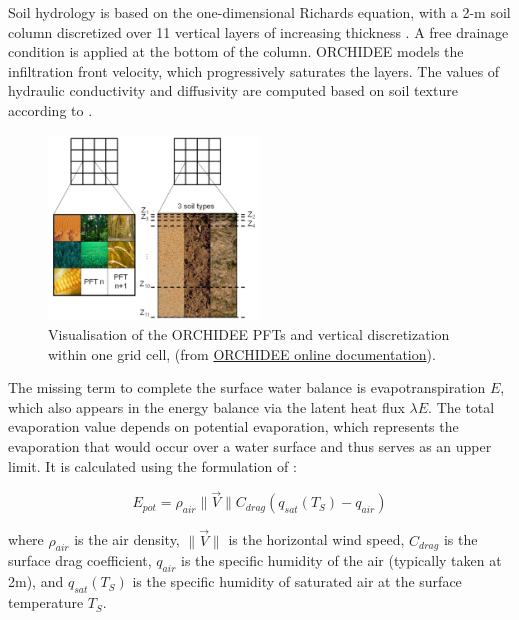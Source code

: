 Soil hydrology is based on the one-dimensional Richards equation, with a 2-m soil column discretized over 11 vertical layers of increasing thickness \citep{de_rosnay_impact_2002, dorgeval_sensitivity_2008}. A free drainage condition is applied at the bottom of the column. ORCHIDEE models the infiltration front velocity, which progressively saturates the layers. The values of hydraulic conductivity and diffusivity are computed based on soil texture according to \citet{mualem_new_1976, van_genuchten_closed-form_1980}.

\begin{figure}[hbtp]
    \centering
    \includegraphics[width=0.5\textwidth]{images/methods/ORC_discretization.png}
    \caption{Visualisation of the ORCHIDEE PFTs and vertical discretization within one grid cell, (from \href{https://orchidee.ipsl.fr/introduction/}{ORCHIDEE online documentation}).}
    \label{fig:ORC_discretization}
\end{figure}

The missing term to complete the surface water balance is evapotranspiration $E$, which also appears in the energy balance via the latent heat flux $\lambda E$. The total evaporation value depends on potential evaporation, which represents the evaporation that would occur over a water surface and thus serves as an upper limit. It is calculated using the formulation of \citet{Budyko_1956}:  

\begin{equation}
    E_{pot} = \rho_{air}  \lVert \vec{V} \rVert C_{drag} (q_{sat}(T_S) - q_{air})
\end{equation}

where $\rho_{air}$ is the air density, $\lVert \vec{V} \rVert$ is the horizontal wind speed, $C_{drag}$ is the surface drag coefficient, $q_{air}$ is the specific humidity of the air (typically taken at 2m), and $q_{sat}(T_S)$ is the specific humidity of saturated air at the surface temperature $T_S$.

